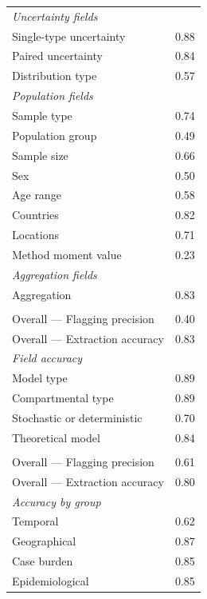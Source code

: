 {\begin{longtable}{>{\raggedright\arraybackslash}p{10.8cm} S[table-format=1.2, round-mode=places, round-precision=2]}
\addlinespace[0.35em]
\textit{Uncertainty fields} & {} \\
\quad Single-type uncertainty & 0.88 \\
\quad Paired uncertainty & 0.84 \\
\quad Distribution type & 0.57 \\

\addlinespace[0.35em]
\textit{Population fields} & {} \\
\quad Sample type & 0.74 \\
\quad Population group & 0.49 \\
\quad Sample size & 0.66 \\
\quad Sex & 0.50 \\
\quad Age range & 0.58 \\
\quad Countries & 0.82 \\
\quad Locations & 0.71 \\
\quad Method moment value & 0.23 \\

\addlinespace[0.35em]
\textit{Aggregation fields} & {} \\
\quad Aggregation & 0.83 \\

\addlinespace[0.6em]
 \\
\addlinespace[0.2em]
Overall --- Flagging precision & 0.40 \\
Overall --- Extraction accuracy & 0.83 \\

\addlinespace[0.35em]
\textit{Field accuracy} & {} \\
\quad Model type & 0.89 \\
\quad Compartmental type & 0.89 \\
\quad Stochastic or deterministic & 0.70 \\
\quad Theoretical model & 0.84 \\

\addlinespace[0.6em]
 \\
\addlinespace[0.2em]
Overall --- Flagging precision & 0.61 \\
Overall --- Extraction accuracy & 0.80 \\

\addlinespace[0.35em]
\textit{Accuracy by group} & {} \\
\quad Temporal & 0.62 \\
\quad Geographical & 0.87 \\
\quad Case burden & 0.85 \\
\quad Epidemiological & 0.85 \\


\end{longtable}}
